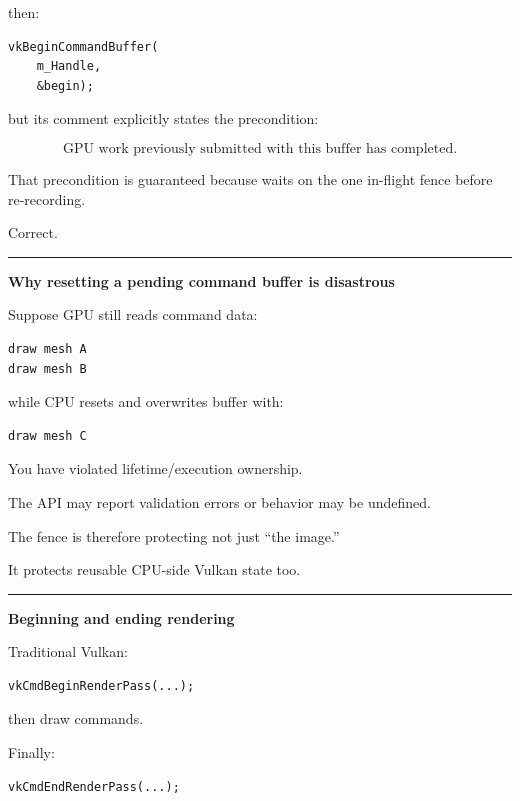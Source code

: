 then:

\begin{verbatim}
vkBeginCommandBuffer(
    m_Handle,
    &begin);
\end{verbatim}

but its comment explicitly states the precondition:

\[
\boxed{
\text{GPU work previously submitted with this buffer has completed}.
}
\]

That precondition is guaranteed because  waits on the one in-flight fence before re-recording.

Correct.

\begin{center}\rule{0.5\linewidth}{0.5pt}\end{center}

\textbf{Why resetting a pending command buffer is disastrous}

Suppose GPU still reads command data:

\begin{verbatim}
draw mesh A
draw mesh B
\end{verbatim}

while CPU resets and overwrites buffer with:

\begin{verbatim}
draw mesh C
\end{verbatim}

You have violated lifetime/execution ownership.

The API may report validation errors or behavior may be undefined.

The fence is therefore protecting not just ``the image.''

It protects reusable CPU-side Vulkan state too.

\begin{center}\rule{0.5\linewidth}{0.5pt}\end{center}

\textbf{Beginning and ending rendering}

Traditional Vulkan:

\begin{verbatim}
vkCmdBeginRenderPass(...);
\end{verbatim}

then draw commands.

Finally:

\begin{verbatim}
vkCmdEndRenderPass(...);
\end{verbatim}

